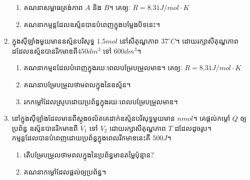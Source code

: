 \begin{enumerate}[m]
\begin{enumerate}[k]
		\item គណនាសម្ពាធត្រង់ភាព $A$ និង $B$។ គេឲ្យៈ $R=8.31J/mol\cdot K$
		\item គណនាកម្មន្តដែលឧស្ម័នបានបំពេញក្នុងបម្លែងបិទនេះ។
	\end{enumerate}
	\item ក្នុងសុីឡាំងមួយមានឧស្ម័នបរិសុទ្ធ $1.5mol$ នៅសីតុណ្ហភាព $37^\circ C$។ ដោយរក្សាសីតុណ្ហភាពដដែលឧស្ម័នបានរីកមាឌពី$450dm^{3}$ ទៅ $600dm^{3}$។
	\begin{enumerate}[k]
		\item គណនាកម្មនដែលបំពេញក្នុងរយៈពេលបម្រែបម្រួលមាឌ។ គេឲ្យៈ $R=8.31J/mol\cdot K$
		\item គណនាបម្រែបម្រួលថាមពលក្នុងនៃឧស្ម័ន។
		\item រកកម្តៅដែលស្រូបដោយប្រព័ន្ធក្នុងរយៈពេលបម្រែបម្រួលមាឌ។
	\end{enumerate}
	\item នៅក្នុងសុីឡាំងដែលមានពីស្តុងចល័តគេដាក់ឧស្ម័នបរិសុទ្ធមួយមាន $n mol$។ គេផ្តល់កម្តៅ $Q$ ឲ្យប្រព័ន្ធ ឧស្ម័នបានរីកមាឌពី $V_{1}$ ទៅ $V_{2}$ ដោយរក្សាសីតុណ្ហភាព $T$ ដដែលដូចរូប។\\ កម្មន្តដែលបានបំពេញដោយប្រព័ន្ធក្នុងពេលរីកមាឌនេះគឺ $500J$។
	\begin{enumerate}[k]
		\item តើបម្រែបម្រួលថាមពលក្នុងនៃប្រព័ន្ធមានតម្លៃប៉ុន្មាន?
		\item គណនាកម្តៅដែលផ្តល់ឲ្យប្រព័ន្ធ។
	\end{enumerate}
	\begin{figure}[H]
		\begin{subfigure}[t]{.5\textwidth}
			\centering
\end{subfigure}
\end{figure}
\end{enumerate}
